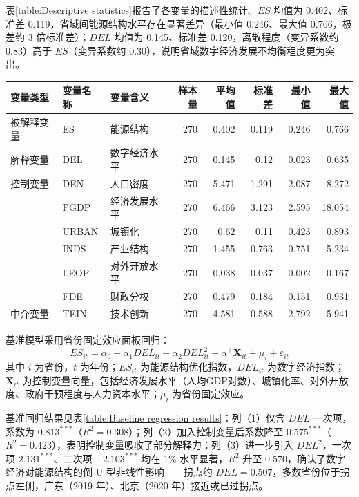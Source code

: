 表\ref{table:Descriptive statistics}报告了各变量的描述性统计。$ES$ 均值为 0.402、标准差 0.119，省域间能源结构水平存在显著差异（最小值 0.246、最大值 0.766，极差约 3 倍标准差）；$DEL$ 均值为 0.145、标准差 0.120，离散程度（变异系数约 0.83）高于 $ES$（变异系数约 0.30），说明省域数字经济发展不均衡程度更为突出。
\begin{table}[h!]
  \begin{center}
  \begin{tabular}{lllrrrrr}
    \hline
    变量类型 & 变量名称 & 变量含义 & 样本量 & 平均值 & 标准差 & 最小值 & 最大值 \\
    \hline
    被解释变量 & ES & 能源结构 & 270 & 0.402 & 0.119 & 0.246 & 0.766 \\
    解释变量 & DEL & 数字经济水平 & 270 & 0.145 & 0.12 & 0.023 & 0.635 \\
    控制变量 & DEN & 人口密度 & 270 & 5.471 & 1.291 & 2.087 & 8.272 \\
    ~ & PGDP & 经济发展水平 & 270 & 6.466 & 3.123 & 2.595 & 18.054 \\
    ~ & URBAN & 城镇化 & 270 & 0.62 & 0.11 & 0.423 & 0.893 \\
    ~ & INDS & 产业结构 & 270 & 1.455 & 0.763 & 0.751 & 5.234 \\
    ~ & LEOP & 对外开放水平 & 270 & 0.038 & 0.037 & 0.002 & 0.167 \\
    ~ & FDE & 财政分权 & 270 & 0.479 & 0.184 & 0.151 & 0.931 \\
    中介变量 & TEIN & 技术创新 & 270 & 4.581 & 0.588 & 2.792 & 5.941 \\
    \hline
  \end{tabular}
  \end{center}
\end{table}
基准模型采用省份固定效应面板回归：
\begin{equation}
    ES_{it} = \alpha_0 + \alpha_1 DEL_{it} + \alpha_2 DEL_{it}^2 + {\alpha}^\top \mathbf{X}_{it} + \mu_i + \varepsilon_{it}
    \label{eq:benchmark_model}
\end{equation}
其中 $i$ 为省份，$t$ 为年份；$ES_{it}$ 为能源结构优化指数，$DEL_{it}$ 为数字经济指数；$\mathbf{X}_{it}$ 为控制变量向量，包括经济发展水平（人均GDP对数）、城镇化率、对外开放度、政府干预程度与人力资本水平；$\mu_i$ 为省份固定效应。

基准回归结果见表\ref{table:Baseline regression results}：列（1）仅含 $DEL$ 一次项，系数为 $0.813^{***}$（$R^2=0.308$）；列（2）加入控制变量后系数降至 $0.575^{***}$（$R^2=0.423$），表明控制变量吸收了部分解释力；列（3）进一步引入 $DEL^2$，一次项 $2.131^{***}$、二次项 $-2.103^{***}$ 均在 1\% 水平显著，$R^2$ 升至 0.570，确认了数字经济对能源结构的倒 U 型非线性影响——拐点约 $DEL=0.507$，多数省份位于拐点左侧，广东（2019 年）、北京（2020 年）接近或已过拐点。

